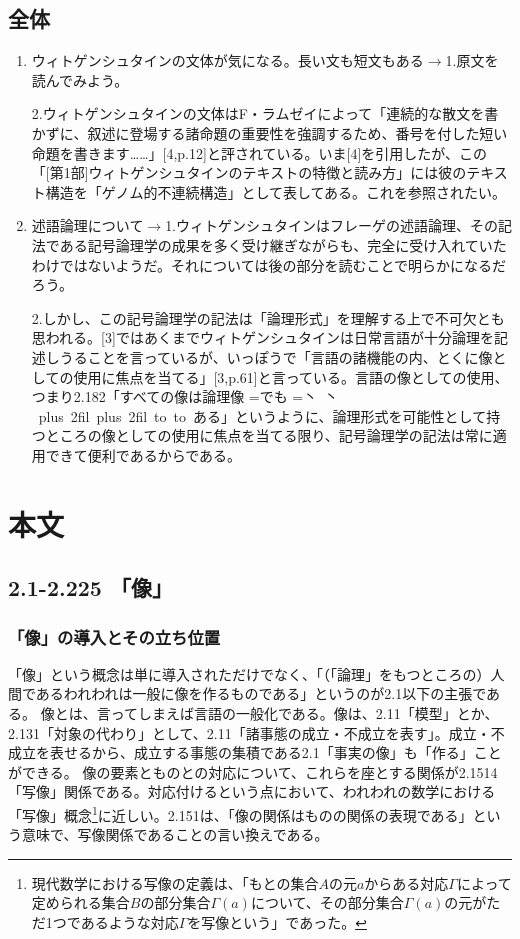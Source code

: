 \documentclass[11pt,a4paper]{jsbook}
\newcommand{\ruby}[2]{%
    \leavevmode
    \setbox0=\hbox{#1}%
    \setbox1=\hbox{\tiny #2}%
    \ifdim\wd0>\wd1 \dimen0=\wd0 \else \dimen0=\wd1 \fi
    \hbox{%
    \kanjiskip=0pt plus 2fil
    \xkanjiskip=0pt plus 2fil
    \vbox{%
    \hbox to \dimen0{%
    \tiny \hfil#2\hfil}%
    \nointerlineskip
    \hbox to \dimen0{\mathstrut\hfil#1\hfil}}}}
\begin{document}
\subsection{全体}
\begin{enumerate}
\item
ウィトゲンシュタインの文体が気になる。長い文も短文もある$\rightarrow$1.原文を読んでみよう。

2.ウィトゲンシュタインの文体はF・ラムゼイによって「連続的な散文を書かずに、叙述に登場する諸命題の重要性を強調するため、番号を付した短い命題を書きます……」[4,p.12]と評されている。いま[4]を引用したが、この「[第1部]ウィトゲンシュタインのテキストの特徴と読み方」には彼のテキスト構造を「ゲノム的不連続構造」として表してある。これを参照されたい。

\item
述語論理について$\rightarrow$1.ウィトゲンシュタインはフレーゲの述語論理、その記法である記号論理学の成果を多く受け継ぎながらも、完全に受け入れていたわけではないようだ。それについては後の部分を読むことで明らかになるだろう。

2.しかし、この記号論理学の記法は「論理形式」を理解する上で不可欠とも思われる。[3]ではあくまでウィトゲンシュタインは日常言語が十分論理を記述しうることを言っているが、いっぽうで「言語の諸機能の内、とくに像としての使用に焦点を当てる」[3,p.61]と言っている。言語の像としての使用、つまり2.182「すべての像は論理像\ruby{でも}{丶 丶}ある」というように、論理形式を可能性として持つところの像としての使用に焦点を当てる限り、記号論理学の記法は常に適用できて便利であるからである。

\end{enumerate}
\section{本文} \label{hombun}
\subsection{2.1-2.225 「像」}

\subsubsection{「像」の導入とその立ち位置}
「像」という概念は単に導入されただけでなく、「（「論理」をもつところの）人間であるわれわれは一般に像を作るものである」というのが2.1以下の主張である。
像とは、言ってしまえば言語の一般化である。像は、2.11「模型」とか、2.131「対象の代わり」として、2.11「諸事態の成立・不成立を表す」。成立・不成立を表せるから、成立する事態の集積である2.1「事実の像」も「作る」ことができる。
像の要素とものとの対応について、これらを座とする関係が2.1514「写像」関係である。対応付けるという点において、われわれの数学における「写像」概念\footnote{現代数学における写像の定義は、「もとの集合$A$の元$a$からある対応$\Gamma$によって定められる集合$B$の部分集合$\Gamma (a)$について、その部分集合$\Gamma (a)$の元がただ1つであるような対応$\Gamma$を写像という」であった。}に近しい。2.151は、「像の関係はものの関係の表現である」という意味で、写像関係であることの言い換えである。
\end{document}
